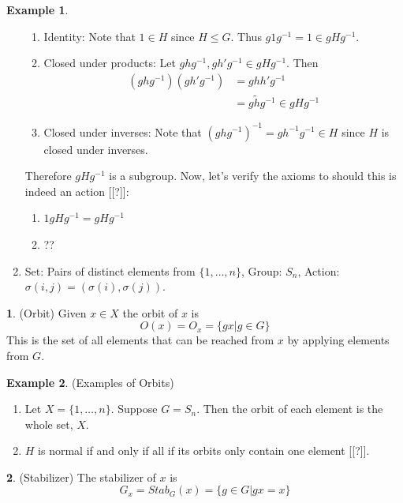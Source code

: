 \documentclass[12pt]{article}
\theoremstyle{definition}
\newtheorem{definition}{\color{NavyBlue}{\textbf{Definition}}}
\newtheorem{example}{\color{WildStrawberry}Example}
\theoremstyle{definition}
\begin{document}
\begin{example}
\begin{enumerate}
\begin{enumerate}
		\item Identity: Note that $1 \in H$ since $H \leq G$. Thus $g1g^{-1} = 1\in gHg^{-1}$. 
		\item Closed under products: Let $ghg^{-1}, gh'g^{-1} \in gHg^{-1}$. Then
		\begin{align*}
			(ghg^{-1})(gh'g^{-1}) &= ghh'g^{-1} \\
			&= g\tilde{h} g^{-1} \in gHg^{-1} \tag{$H$ closed under multiplication}
		\end{align*}
		\item Closed under inverses: Note that $(ghg^{-1})^{-1} = gh^{-1}g^{-1} \in H$ since $H$ is closed under inverses. 
	\end{enumerate}
	Therefore $gHg^{-1}$ is a subgroup. Now, let's verify the axioms to should this is indeed an action [[?]]:
	\begin{enumerate}
		\item $1 gHg^{-1}= gHg^{-1}$
		\item ??
	\end{enumerate}
	\item Set: Pairs of distinct elements from $\{1, \ldots, n\}$, Group: $S_n$, Action: $\sigma(i,j) = (\sigma(i), \sigma(j))$. 
\end{enumerate}
\end{example}

\begin{definition}(Orbit)
Given $x \in X$ the orbit of $x$ is 
\begin{equation}
	O(x) = O_x = \{gx | g \in G\}
\end{equation}
This is the set of all elements that can be reached from $x$ by applying elements from $G$. 
\end{definition}

\begin{example}(Examples of Orbits)
\begin{enumerate}
	\item Let $X = \{1, \ldots, n\}$. Suppose $G = S_n$. Then the orbit of each element is the whole set, $X$. 
	\item $H$ is normal if and only if all if its orbits only contain one element [[?]]. 
\end{enumerate}
\end{example}

\begin{definition}(Stabilizer)
The stabilizer of $x$ is 
\begin{equation}
	G_x = Stab_G(x) = \{ g\in G | gx = x \}
\end{equation}
\end{definition}
\end{document}
